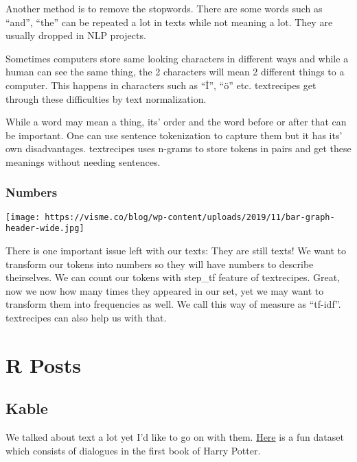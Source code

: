 \documentclass[
  letterpaper,
  DIV=11,
  numbers=noendperiod]{scrreprt}
\begin{document}
Another method is to remove the stopwords. There are some words such as
``and'', ``the'' can be repeated a lot in texts while not meaning a lot.
They are usually dropped in NLP projects.

Sometimes computers store same looking characters in different ways and
while a human can see the same thing, the 2 characters will mean 2
different things to a computer. This happens in characters such as
``İ'', ``ö'' etc. textrecipes get through these difficulties by text
normalization.

While a word may mean a thing, its' order and the word before or after
that can be important. One can use sentence tokenization to capture them
but it has its' own disadvantages. textrecipes uses n-grams to store
tokens in pairs and get these meanings without needing sentences.

\hypertarget{numbers}{%
\subsubsection{Numbers}\label{numbers}}

\texttt{[image: https://visme.co/blog/wp-content/uploads/2019/11/bar-graph-header-wide.jpg]}

There is one important issue left with our texts: They are still texts!
We want to transform our tokens into numbers so they will have numbers
to describe theirselves. We can count our tokens with step\_tf feature
of textrecipes. Great, now we now how many times they appeared in our
set, yet we may want to transform them into frequencies as well. We call
this way of measure as ``tf-idf''. textrecipes can also help us with
that.

\hypertarget{r-posts}{%
\section{R Posts}\label{r-posts}}

\hypertarget{kable}{%
\subsection{Kable}\label{kable}}

We talked about text a lot yet I'd like to go on with them.
\href{https://www.kaggle.com/datasets/eward96/harry-potter-and-the-philosophers-stone-script}{Here}
is a fun dataset which consists of dialogues in the first book of Harry
Potter.
\end{document}
